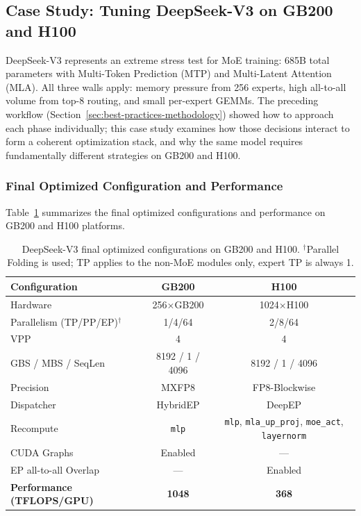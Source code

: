 \subsection{Case Study: Tuning DeepSeek-V3 on GB200 and H100}\label{sec:deepseek-case-study}

DeepSeek-V3 represents an extreme stress test for MoE training: 685B total parameters with Multi-Token Prediction (MTP) and Multi-Latent Attention (MLA). All three walls apply: memory pressure from 256 experts, high all-to-all volume from top-8 routing, and small per-expert GEMMs. The preceding workflow (Section~\ref{sec:best-practices-methodology}) showed how to approach each phase individually; this case study examines how those decisions interact to form a coherent optimization stack, and why the same model requires fundamentally different strategies on GB200 and H100.

\subsubsection{Final Optimized Configuration and Performance}

Table~\ref{tab:deepseekv3-config} summarizes the final optimized configurations and performance on GB200 and H100 platforms.

\begin{table}[ht]
\centering
\caption{DeepSeek-V3 final optimized configurations on GB200 and H100. $^\dagger$Parallel Folding is used; TP applies to the non-MoE modules only, expert TP is always 1.}
\label{tab:deepseekv3-config}
\begin{tabular}{lcc}
\toprule
\textbf{Configuration} & \textbf{GB200} & \textbf{H100} \\
\midrule
Hardware & 256$\times$GB200 & 1024$\times$H100 \\
Parallelism (TP/PP/EP)$^\dagger$ & 1/4/64 & 2/8/64 \\
VPP & 4 & 4 \\
GBS / MBS / SeqLen & 8192 / 1 / 4096 & 8192 / 1 / 4096 \\
Precision & MXFP8 & FP8-Blockwise \\
Dispatcher & HybridEP & DeepEP \\
Recompute & \texttt{mlp} & \texttt{mlp}, \texttt{mla\_up\_proj}, \texttt{moe\_act}, \texttt{layernorm} \\
CUDA Graphs & Enabled & --- \\
EP all-to-all Overlap & --- & Enabled \\
\midrule
\textbf{Performance (TFLOPS/GPU)} & \textbf{1048} & \textbf{368} \\
\bottomrule
\end{tabular}
\end{table}

